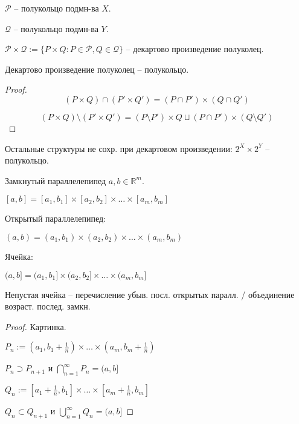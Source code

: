 \begin{definition}
    $\mathcal{P}$ -- полукольцо подмн-ва $X$.

    $\mathcal{Q}$ -- полукольцо подмн-ва $Y$.

    $\mathcal{P} \times \mathcal{Q} := \{P \times Q : P \in \mathcal{P}, Q \in \mathcal{Q}\}$ -- декартово произведение полуколец.
\end{definition}

\begin{theorem}
    Декартово произведение полуколец -- полукольцо.
\end{theorem}
\begin{proof}
    
    $$(P \times Q) \cap (P' \times Q') = (P \cap P') \times (Q \cap Q')$$

    $$(P \times Q) \setminus (P' \times Q') = (P \setminus P') \times Q \sqcup (P \cap P') \times (Q \setminus Q')$$
\end{proof}

\begin{remark}
    Остальные структуры не сохр. при декартовом произведении: $2^X \times 2^Y$ -- полукольцо.
\end{remark}

\begin{definition}
    Замкнутый параллелепипед $a, b \in \mathbb{R}^m$.

    $[a, b] = [a_1, b_1] \times [a_2, b_2] \times \dots \times [a_m, b_m]$

    Открытый параллелепипед:

    $(a, b) = (a_1, b_1) \times (a_2, b_2) \times \dots \times (a_m, b_m)$

    Ячейка:
    
    $(a, b] = (a_1, b_1] \times (a_2, b_2] \times \dots \times (a_m, b_m]$
\end{definition}

\begin{theorem}
    Непустая ячейка -- перечисление убыв. посл. открытых паралл. / объединение возраст. послед. замкн.
\end{theorem}

\begin{proof}
    Картинка.


    $P_n := (a_1, b_1 + \frac{1}{n}) \times \dots \times (a_m, b_m + \frac{1}{n})$

    $P_n \supset P_{n+1}$ и $\bigcap_{n=1}^{\infty}P_n = (a, b]$

    $Q_n := [a_1 + \frac{1}{n}, b_1] \times \dots \times [a_m + \frac{1}{n}, b_m]$

    $Q_n \subset Q_{n+1}$ и $\bigcup_{n=1}^{\infty}Q_n = (a, b]$ 
\end{proof}

